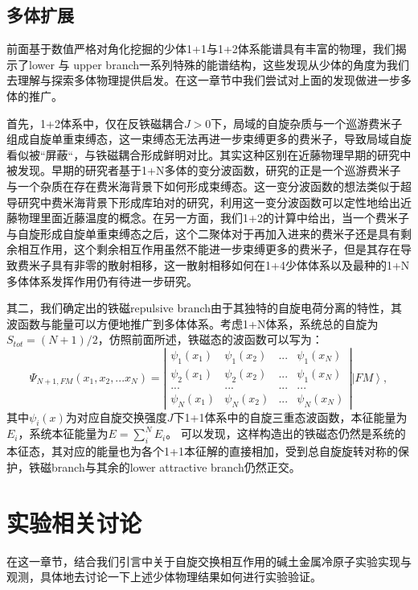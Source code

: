 \subsection{多体扩展}

前面基于数值严格对角化挖掘的少体1+1与1+2体系能谱具有丰富的物理，我们揭示了lower 与 upper branch一系列特殊的能谱结构，这些发现从少体的角度为我们去理解与探索多体物理提供启发。在这一章节中我们尝试对上面的发现做进一步多体的推广。

首先，1+2体系中，仅在反铁磁耦合$J>0$下，局域的自旋杂质与一个巡游费米子组成自旋单重束缚态，这一束缚态无法再进一步束缚更多的费米子，导致局域自旋看似被“屏蔽“，与铁磁耦合形成鲜明对比。其实这种区别在近藤物理早期的研究中被发现\cite{Yosida}。早期的研究者基于1+N多体的变分波函数，研究的正是一个巡游费米子与一个杂质在存在费米海背景下如何形成束缚态。这一变分波函数的想法类似于超导研究中费米海背景下形成库珀对的研究，利用这一变分波函数可以定性地给出近藤物理里面近藤温度的概念。在另一方面，我们1+2的计算中给出，当一个费米子与自旋形成自旋单重束缚态之后，这个二聚体对于再加入进来的费米子还是具有剩余相互作用，这个剩余相互作用虽然不能进一步束缚更多的费米子，但是其存在导致费米子具有非零的散射相移，这一散射相移如何在1+4少体体系以及最种的1+N多体体系发挥作用仍有待进一步研究。

其二，我们确定出的铁磁repulsive branch由于其独特的自旋电荷分离的特性，其波函数与能量可以方便地推广到多体体系。考虑1+N体系，系统总的自旋为$S_{tot}=(N+1)/2$，仿照前面所述，铁磁态的波函数可以写为：
\begin{equation}
\Psi_{N+1,FM}(x_1,x_2,...x_N)=\left|\begin{array}{cccc}\psi_1(x_1) & \psi_1(x_2) & ... &\psi_1(x_N)  \\ \psi_2(x_1) & \psi_2(x_2) & ... &\psi_1(x_N) \\
... & ... & ... &... \\
\psi_N(x_1) & \psi_N(x_2) & ... &\psi_N(x_N)\end{array}\right| \left|FM\right>,
\end{equation}
其中$\psi_i(x)$为对应自旋交换强度$J$下1+1体系中的自旋三重态波函数，本征能量为$E_i$，系统本征能量为$E = \sum_i^N E_i$。
可以发现，这样构造出的铁磁态仍然是系统的本征态，其对应的能量也为各个1+1本征解的直接相加，受到总自旋旋转对称的保护，铁磁branch与其余的lower attractive branch仍然正交。

\section{实验相关讨论}
在这一章节，结合我们引言中关于自旋交换相互作用的碱土金属冷原子实验实现与观测，具体地去讨论一下上述少体物理结果如何进行实验验证。

